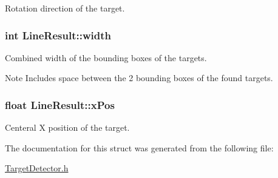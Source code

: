 Rotation direction of the target. 

\hypertarget{structLineResult_afe3f6449af1416355e8209c7fe95359e}{}
\subsubsection[{width}]{\setlength{\rightskip}{0pt plus 5cm}int Line\+Result\+::width}\label{structLineResult_afe3f6449af1416355e8209c7fe95359e}


Combined width of the bounding boxes of the targets. 

\begin{DoxyNote}{Note}
Includes space between the 2 bounding boxes of the found targets. 
\end{DoxyNote}
\hypertarget{structLineResult_a1532cc6c0b0f211cba440eb0ed46f0d0}{}
\subsubsection[{x\+Pos}]{\setlength{\rightskip}{0pt plus 5cm}float Line\+Result\+::x\+Pos}\label{structLineResult_a1532cc6c0b0f211cba440eb0ed46f0d0}


Centeral X position of the target. 



The documentation for this struct was generated from the following file\+:\begin{DoxyCompactItemize}
\item 
\hyperlink{TargetDetector_8h}{Target\+Detector.\+h}\end{DoxyCompactItemize}
